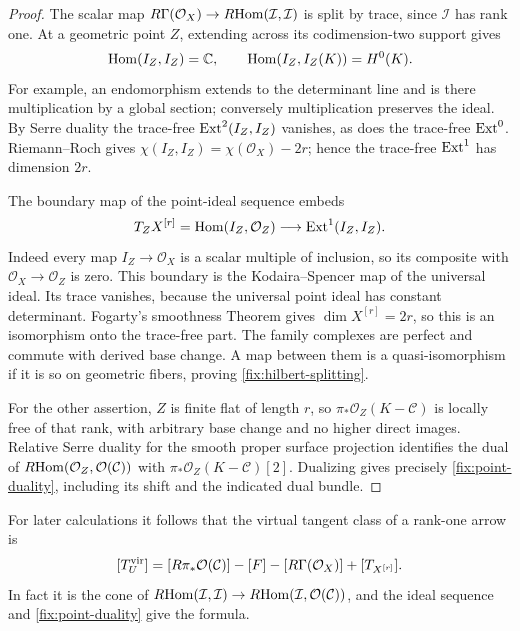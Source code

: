 \begin{proof}
The scalar map \(R\Gamma(\mathcal O_X)\to
R\!\operatorname{Hom}(\mathcal I,\mathcal I)\) is split by trace, since \(\mathcal I\)
has rank one.  At a geometric point \(Z\), extending across its
codimension-two support gives
\[
 \operatorname{Hom}(I_Z,I_Z)=\mathbb C,\qquad
 \operatorname{Hom}(I_Z,I_Z(K))=H^0(K).
\]
For example, an endomorphism extends to the determinant line and is
there multiplication by a global section; conversely multiplication
preserves the ideal.  By Serre duality the trace-free
\(\operatorname{Ext}^2(I_Z,I_Z)\) vanishes, as does the trace-free \(\operatorname{Ext}^0\).
Riemann--Roch gives
\(\chi(I_Z,I_Z)=\chi(\mathcal O_X)-2r\); hence the trace-free
\(\operatorname{Ext}^1\) has dimension \(2r\).

The boundary map of the point-ideal sequence embeds
\[
 T_ZX^{[r]}=\operatorname{Hom}(I_Z,\mathcal O_Z)
       \longrightarrow \operatorname{Ext}^1(I_Z,I_Z).
\]
Indeed every map \(I_Z\to\mathcal O_X\) is a scalar multiple of
inclusion, so its composite with \(\mathcal O_X\to\mathcal O_Z\)
is zero.  This boundary is the Kodaira--Spencer map of the universal
ideal.  Its trace vanishes, because the universal point ideal has
constant determinant.  Fogarty's smoothness Theorem
\cite[Theorem~2.4]{Fogarty} gives \(\dim X^{[r]}=2r\), so this is an isomorphism
onto the trace-free part.  The family complexes are perfect and
commute with derived base change.  A map between them is a
quasi-isomorphism if it is so on geometric fibers, proving
\eqref{fix:hilbert-splitting}.

For the other assertion, \(Z\) is finite flat of length \(r\), so
\(\pi_*\mathcal O_Z(K-\mathcal C)\) is locally free of that rank,
with arbitrary base change and no higher direct images.  Relative
Serre duality for the smooth proper surface projection identifies
the dual of \(R\!\operatorname{Hom}(\mathcal O_Z,\mathcal O(\mathcal C))\) with
\(\pi_*\mathcal O_Z(K-\mathcal C)[2]\).
Dualizing gives precisely \eqref{fix:point-duality}, including its
shift and the indicated dual bundle.
\end{proof}

For later calculations it follows that the virtual tangent class of
a rank-one arrow is
\begin{equation}\label{fix:arrow-class}
 [T_U^{\mathrm{vir}}]
 =[R\pi_*\mathcal O(\mathcal C)]-[F]
       -[R\Gamma(\mathcal O_X)]+[T_{X^{[r]}}].
\end{equation}
In fact it is the cone of
\(R\!\operatorname{Hom}(\mathcal I,\mathcal I)\to
R\!\operatorname{Hom}(\mathcal I,\mathcal O(\mathcal C))\), and the ideal sequence
and \eqref{fix:point-duality} give the formula.

